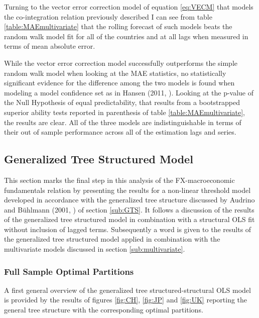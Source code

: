 Turning to the vector error correction model of equation \ref{eq:VECM}
that models the co-integration relation previously described I can see
from table \ref{table:MAEmultivariate} that the rolling forecast of
such models beats the random walk model fit for all of the countries
and at all lags when measured in terms of mean absolute error.

While the vector error correction model successfully outperforms the
simple random walk model when looking at the MAE statistics, no
statistically significant evidence for the difference among the two
models is found when modeling a model confidence set as in Hansen
(2011, \cite{HansenMCS}). Looking at the p-value of the Null
Hypothesis of equal predictability, that results from a bootstrapped
superior ability tests reported in parenthesis of table
\ref{table:MAEmultivariate}, the results are clear. All of the three
models are indistinguishable in terms of their out of sample
performance across all of the estimation lags and series.

\subsection{Generalized Tree Structured Model}

This section marks the final step in this analysis of the
FX-macroeconomic fundamentals relation by presenting the results for a
non-linear threshold model developed in accordance with the
generalized tree structure discussed by Audrino and B{\"u}hlmann
(2001, \cite{AudrinoBuhlmann}) of section
\ref{sub:GTS}. It follows a discussion of the results of the
generalized tree structured model in combination with a structural OLS
fit without inclusion of lagged terms. Subsequently a word is
given to the results of the generalized tree structured model applied
in combination with the multivariate models discussed in section
\ref{sub:multivariate}.

\subsubsection{Full Sample Optimal Partitions}

A first general overview of the generalized tree structured-structural
OLS model is provided by the results of figures \ref{fig:CH},
\ref{fig:JP} and \ref{fig:UK} reporting the general tree structure
with the corresponding optimal partitions. 

